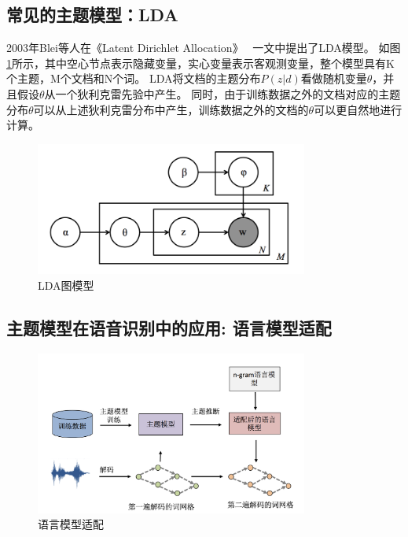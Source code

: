 \subsection{常见的主题模型：LDA}

2003年Blei等人在《Latent Dirichlet Allocation》~\cite{blei2003latent} 一文中提出了LDA模型。
如图\ref{pic:lda}所示，其中空心节点表示隐藏变量，实心变量表示客观测变量，整个模型具有K个主题，M个文档和N个词。
LDA将文档的主题分布$P(z|d)$看做随机变量$\theta$，并且假设$\theta$从一个狄利克雷先验中产生。
同时，由于训练数据之外的文档对应的主题分布$\theta$可以从上述狄利克雷分布中产生，训练数据之外的文档的$\theta$可以更自然地进行计算。

\begin{figure}[htb]
	\begin{center}
		\includegraphics[width=0.8\textwidth]{img/chapter_lm/lda.png}
		\caption{LDA图模型}
		\label{pic:lda}
	\end{center}
\end{figure}

\subsection{主题模型在语音识别中的应用: 语言模型适配}

\begin{figure}[htb]
	\begin{center}
		\includegraphics[width=0.8\textwidth]{img/chapter_lm/lma2.png}
		\caption{语言模型适配}
		\label{pic:lma}
	\end{center}
\end{figure}

